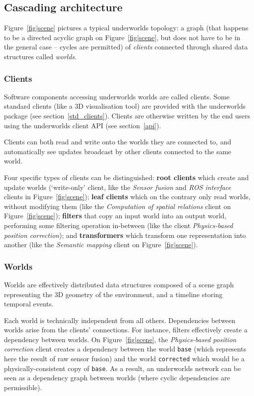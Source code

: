 \documentclass[conference]{IEEEtran}
\newcommand{\uwds}{{\sc underworlds}\xspace}
\begin{document}
\subsection{Cascading architecture}

Figure~\ref{fig|scene} pictures a typical \uwds topology: a graph (that
happens to be a directed acyclic graph on Figure~\ref{fig|scene}, but does not
have to be in the general case -- cycles are permitted) of \emph{clients}
connected through shared data structures called \emph{worlds}.

\subsubsection{Clients}

Software components accessing \uwds worlds are called clients. Some standard
clients (like a 3D visualisation tool) are provided with the \uwds package (see
section~\ref{std_clients}). Clients are otherwise written by the end users
using the \uwds client API (see section~\ref{api}).

Clients can both read and write onto the worlds they are connected to, and
automatically see updates broadcast by other clients connected to the same
world.

Four specific types of clients can be distinguished: \textbf{root clients} which
create and update worlds (`write-only' client, like the \emph{Sensor fusion} and
\emph{ROS interface} clients in Figure~\ref{fig|scene}); \textbf{leaf clients}
which on the contrary only read worlds, without modifying them (like the
\emph{Computation of spatial relations} client on Figure~\ref{fig|scene});
\textbf{filters} that copy an input world into an output world, performing
some filtering operation in-between (like the client \textit{Physics-based
position correction}); and \textbf{transformers} which transform one
representation into another (like the \emph{Semantic mapping} client on
Figure~\ref{fig|scene}).

\subsubsection{Worlds}

Worlds are effectively distributed data structures composed of a scene graph
representing the 3D geometry of the environment, and a timeline storing temporal
events.

Each world is technically independent from all others. Dependencies between
worlds arise from the clients' connections. For instance, filters effectively
create a dependency between worlds. On Figure~\ref{fig|scene}, the \textit{Physics-based
position correction} client creates a dependency between the world {\tt base} (which
represents here the result of raw sensor fusion) and the world {\tt corrected}
which would be a physically-consistent copy of {\tt base}.
As a result, an \uwds network can be seen as a dependency graph between worlds (where
cyclic dependencies are permissible).
\end{document}
